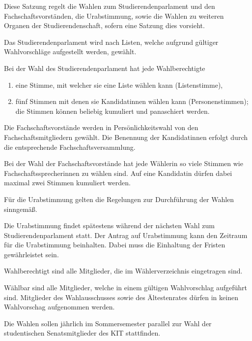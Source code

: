 \label{wahl:geltungsbereich}
\parnumberfalse Diese Satzung regelt die Wahlen zum Studierendenparlament und den Fachschaftsvorständen, die Urabstimmung, sowie die Wahlen zu weiteren Organen der Studierendenschaft, sofern eine Satzung dies vorsieht. \parnumbertrue

\label{wahl:wahlsystem}
Das Studierendenparlament wird nach Listen, welche aufgrund gültiger Wahlvorschläge aufgestellt werden, gewählt. 

Bei der Wahl des Studierendenparlament hat jede Wahlberechtigte
\begin{enumerate}
    \item eine Stimme, mit welcher sie eine Liste wählen kann (Listenstimme),
    \item fünf Stimmen mit denen sie Kandidatinnen wählen kann (Personenstimmen); die Stimmen können beliebig kumuliert und panaschiert werden.
\end{enumerate}

Die Fachschaftsvorstände werden in Persönlichkeitswahl von den Fachschaftsmitgliedern gewählt. Die Benennung der Kandidatinnen erfolgt durch die entsprechende Fachschaftsversammlung.

Bei der Wahl der Fachschaftsvorstände hat jede Wählerin so viele Stimmen wie Fachschaftssprecherinnen zu wählen sind. Auf eine Kandidatin dürfen dabei maximal zwei Stimmen kumuliert werden.

\label{wahl:urabstimmung}
Für die Urabstimmung gelten die Regelungen zur Durchführung der Wahlen sinngemäß. 

Die Urabstimmung findet spätestens während der nächsten Wahl zum Studierendenparlament statt. Der Antrag auf Urabstimmung kann den Zeitraum für die Urabstimmung beinhalten. Dabei muss die Einhaltung der Fristen gewährleistet sein.

\label{wahl:wahlberechtigung}

Wahlberechtigt sind alle Mitglieder, die im Wählerverzeichnis eingetragen sind.

Wählbar sind alle Mitglieder, welche in einem gültigen Wahlvorschlag aufgeführt sind. Mitglieder des Wahlausschusses sowie des Ältestenrates dürfen in keinen Wahlvorschag aufgenommen werden.

\label{wahl:walhtermin}
Die Wahlen sollen jährlich im Sommersemester parallel zur Wahl der studentischen Senatsmitglieder des KIT stattfinden. 

